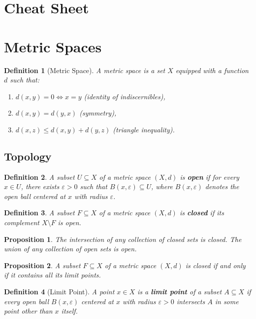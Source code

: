 \documentclass{article}
\newtheorem{definition}{Definition}
\newtheorem{proposition}{Proposition}
\begin{document}
\section*{Cheat Sheet}

\section*{Metric Spaces}

\begin{definition}[Metric Space]
A metric space is a set $X$ equipped with a function $d$ such that:
\begin{enumerate}
    \item $d(x, y) = 0 \iff x = y$ (identity of indiscernibles),
    \item $d(x, y) = d(y, x)$ (symmetry),
    \item $d(x, z) \leq d(x, y) + d(y, z)$ (triangle inequality).
\end{enumerate}
\end{definition}

\subsection*{Topology}

\begin{definition}
A subset $U \subseteq X$ of a metric space $(X, d)$ is \textbf{open} if for every $x \in U$, there exists $\varepsilon > 0$ such that $B(x, \varepsilon) \subseteq U$, where $B(x, \varepsilon)$ denotes the open ball centered at $x$ with radius $\varepsilon$.
\end{definition}

\begin{definition}
A subset $F \subseteq X$ of a metric space $(X, d)$ is \textbf{closed} if its complement $X \setminus F$ is open.
\end{definition}

\begin{proposition}
The intersection of any collection of closed sets is closed. The union of any collection of open sets is open.
\end{proposition}

\begin{proposition}
A subset $F \subseteq X$ of a metric space $(X, d)$ is closed if and only if it contains all its limit points.
\end{proposition}

\begin{definition}[Limit Point]
A point $x \in X$ is a \textbf{limit point} of a subset $A \subseteq X$ if every open ball $B(x, \varepsilon)$ centered at $x$ with radius $\varepsilon > 0$ intersects $A$ in some point other than $x$ itself.
\end{definition}
\end{document}
